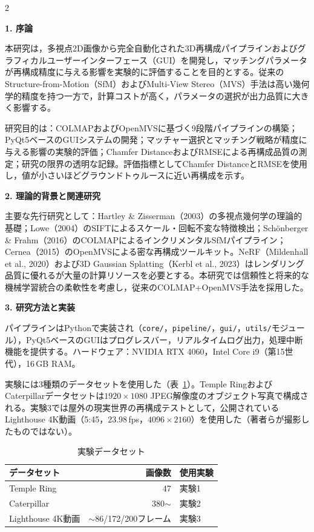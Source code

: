 \begin{multicols}{2}
\setlength{\parskip}{5pt}
\sloppy

\noindent\textbf{1. 序論}

本研究は，多視点2D画像から完全自動化された3D再構成パイプラインおよびグラフィカルユーザーインターフェース（GUI）を開発し，マッチングパラメータが再構成精度に与える影響を実験的に評価することを目的とする。従来のStructure-from-Motion（SfM）およびMulti-View Stereo（MVS）手法は高い幾何学的精度を持つ一方で，計算コストが高く，パラメータの選択が出力品質に大きく影響する。

研究目的は：COLMAPおよびOpenMVSに基づく9段階パイプラインの構築；PyQt5ベースのGUIシステムの開発；マッチャー選択とマッチング戦略が精度に与える影響の実験的評価；Chamfer DistanceおよびRMSEによる再構成品質の測定；研究の限界の透明な記録。評価指標としてChamfer DistanceとRMSEを使用し，値が小さいほどグラウンドトゥルースに近い再構成を示す。

\noindent\textbf{2. 理論的背景と関連研究}

主要な先行研究として：Hartley \& Zisserman（2003）の多視点幾何学の理論的基礎；Lowe（2004）のSIFTによるスケール・回転不変な特徴検出；Sch{\"o}nberger \& Frahm（2016）のCOLMAPによるインクリメンタルSfMパイプライン；Cernea（2015）のOpenMVSによる密な再構成ツールキット。NeRF（Mildenhall et al., 2020）および3D Gaussian Splatting（Kerbl et al., 2023）はレンダリング品質に優れるが大量の計算リソースを必要とする。本研究では信頼性と将来的な機械学習統合の柔軟性を考慮し，従来のCOLMAP+OpenMVS手法を採用した。

\noindent\textbf{3. 研究方法と実装}

パイプラインはPythonで実装され（\texttt{core/}，\texttt{pipeline/}，\texttt{gui/}，\texttt{utils/}モジュール），PyQt5ベースのGUIはプログレスバー，リアルタイムログ出力，処理中断機能を提供する。ハードウェア：NVIDIA RTX 4060，Intel Core i9（第15世代），16\,GB RAM。

実験には3種類のデータセットを使用した（表~\ref{tab:summary_jp_datasets}）。Temple RingおよびCaterpillarデータセットは$1920\times1080$ JPEG解像度のオブジェクト写真で構成される。実験3では屋外の現実世界の再構成テストとして，公開されているLighthouse 4K動画（5:45，23.98\,fps，$4096\times2160$）を使用した（著者らが撮影したものではない）。

\begin{table}[H]
\centering
\caption{実験データセット}
\label{tab:summary_jp_datasets}
\scriptsize
\setlength{\tabcolsep}{3pt}
\begin{tabular}{|l|r|l|}
\hline
\textbf{データセット} & \textbf{画像数} & \textbf{使用実験} \\ \hline
Temple Ring & 47 & 実験1 \\ \hline
Caterpillar & 380${\sim}$ & 実験2 \\ \hline
Lighthouse 4K動画 & ${\sim}$86/172/200フレーム & 実験3 \\ \hline
\end{tabular}
\end{table}


\end{multicols}
